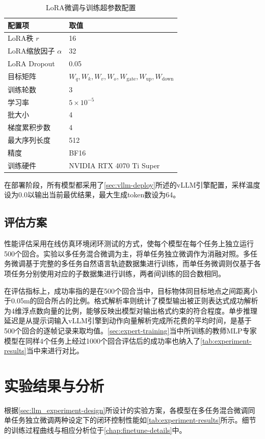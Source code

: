 \begin{table}[htbp]
  \centering
  \caption{LoRA微调与训练超参数配置}\label{tab:training-config}
  \begin{tabular}{ll}
    \toprule
    配置项 & 取值 \\
    \midrule
    LoRA秩 $r$ & 16 \\
    LoRA缩放因子 $\alpha$ & 32 \\
    LoRA Dropout & 0.05 \\
    目标矩阵 & $W_q, W_k, W_v, W_o, W_{\text{gate}}, W_{\text{up}}, W_{\text{down}}$ \\
    \midrule
    训练轮数 & 3 \\
    学习率 & $5 \times 10^{-5}$ \\
    批大小 & 4 \\
    梯度累积步数 & 4 \\
    最大序列长度 & 512 \\
    精度 & BF16 \\
    \midrule
    训练硬件 & NVIDIA RTX 4070 Ti Super \\
    \bottomrule
  \end{tabular}
\end{table}

在部署阶段，所有模型都采用了\cref{sec:vllm-deploy}所述的vLLM引擎配置，采样温度设为0.0以输出当前最优结果，最大生成token数设为64。

\subsection{评估方案}
性能评估采用在线仿真环境闭环测试的方式，使每个模型在每个任务上独立运行500个回合。实验以多任务混合微调为主，将单任务独立微调作为消融对照。多任务微调基于完整的多任务自然语言轨迹数据集进行训练，而单任务微调则仅基于各项任务分别使用对应的子数据集进行训练，两者间训练的回合数相同。

在评估指标上，成功率指的是在500个回合当中，目标物体同目标地点之间距离小于0.05m的回合所占的比例。格式解析率则统计了模型输出被正则表达式成功解析为4维浮点数向量的比例，能够反映出模型对输出格式约束的符合程度。单步推理延迟是从提示词输入vLLM引擎到动作向量解析完成所花费的平均时间，是基于500个回合的逐帧记录来取均值。\cref{sec:expert-training}当中所训练的教师MLP专家模型在同样4个任务上经过1000个回合评估后的成功率也纳入了\cref{tab:experiment-results}当中来进行对比。

\section{实验结果与分析}\label{sec:llm_experiment-results}
根据\cref{sec:llm_experiment-design}所设计的实验方案，各模型在多任务混合微调同单任务独立微调两种设定下的闭环控制性能如\cref{tab:experiment-results}所示。细节的训练过程曲线与相应分析位于\cref{chap:finetune-details}中。

